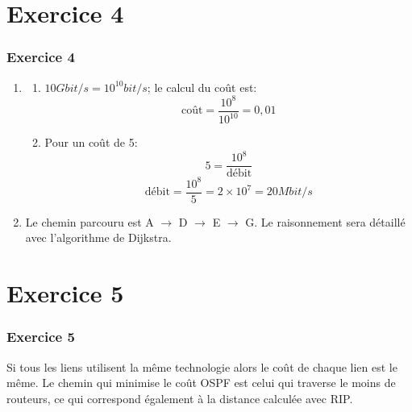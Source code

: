 \documentclass[svgnames,11pt]{beamer}
\begin{document}
\section{Exercice 4}
\begin{frame}
    \frametitle{Exercice 4}

    \begin{enumerate}
        \item \begin{enumerate}
            \item $10Gbit/s = 10^{10}bit/s$; le calcul du coût est:
            $$\mbox{coût} = \dfrac{10^8}{10^{10}}=0,01$$
            \item Pour un coût de 5:
            $$5=\dfrac{10^8}{\mbox{débit}}$$
            $$\mbox{débit}=\dfrac{10^8}{5}=2×10^7=20Mbit/s$$
        \end{enumerate}
        \item Le chemin parcouru est A $\rightarrow$ D $\rightarrow$ E $\rightarrow$ G. Le raisonnement sera détaillé avec l'algorithme de Dijkstra.
    \end{enumerate}

\end{frame}
\section{Exercice 5}
\begin{frame}
    \frametitle{Exercice 5}

    Si tous les liens utilisent la même technologie alors le coût de chaque lien est le même. Le chemin qui minimise le coût OSPF est celui qui traverse le moins de routeurs, ce qui correspond également à la distance calculée avec RIP.

\end{frame}
\end{document}
